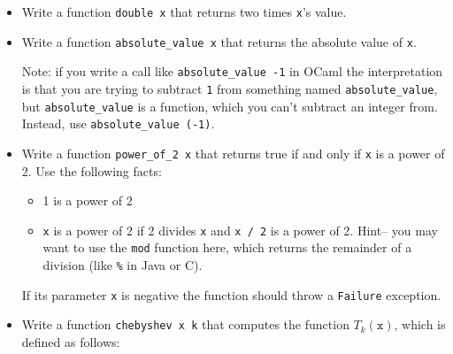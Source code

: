 \documentclass[11pt]{article}
\begin{document}
    \begin{itemize}

      \addtolength{\itemsep}{-1mm}

      \item Write a function \texttt{double x} that returns two times
            \texttt{x}'s value.

      \item Write a function \texttt{absolute\_value x} that returns the
            absolute value of \texttt{x}.

            Note: if you write a call like \texttt{absolute\_value -1} in
            OCaml the interpretation is that you are trying to subtract
            \texttt{1} from something named \texttt{absolute\_value}, but
            \texttt{absolute\_value} is a function, which you can't subtract
            an integer from.  Instead, use \texttt{absolute\_value (-1)}.

      \item Write a function \texttt{power\_of\_2 x} that returns true if
            and only if \texttt{x} is a power of 2.  Use the following
            facts:

            \vspace{-2.5mm}

            \begin{itemize}

              \item 1 is a power of 2

              \item \texttt{x} is a power of 2 if 2 divides \texttt{x} and
                    \texttt{x / 2} is a power of 2.  Hint-- you may want to
                    use the \texttt{mod} function here, which returns the
                    remainder of a division (like \texttt{\%} in Java or C).

            \end{itemize}

            \vspace{-2.5mm}

            If its parameter \texttt{x} is negative the function should
            throw a \texttt{Failure} exception.

      \item Write a function \texttt{chebyshev x k} that computes the
            function $T_k(\texttt{x})$, which is defined as follows:

            \enlargethispage{3mm}


\end{itemize}
\end{document}
